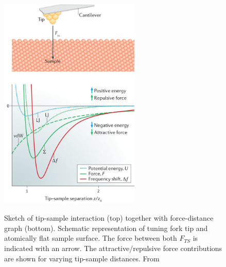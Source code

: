 \begin{figure}\centering
	\includegraphics[width=0.6\textwidth]{./images/s41570-016-0005-f1}
		\label{fig:AFM-force}
	\caption{Sketch of tip-sample interaction (top) together with force-distance graph (bottom). Schematic representation of tuning fork tip and atomically flat sample surface. The force between both $F_{TS}$ is indicated with an arrow. The attractive/repulsive force contributions are shown for varying tip-sample distances. From \cite{pavlicek_generation_2017}}
	\label{fig:AFM-sketch}%
\end{figure}

%	


